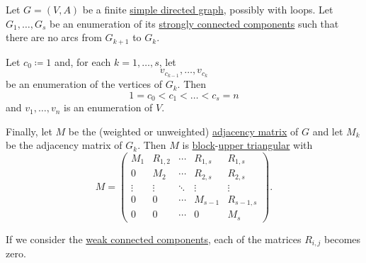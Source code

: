 \begin{proposition}\label{thm:adjacency_matrix_components}
  Let \( G = (V, A) \) be a finite \hyperref[def:directed_graph]{simple directed graph}, possibly with loops. Let \( G_1, \ldots, G_s \) be an enumeration of its \hyperref[def:graph_connectedness/strong]{strongly connected components} such that there are no arcs from \( G_{k+1} \) to \( G_k \).

  Let \( c_0 \coloneqq 1 \) and, for each \( k = 1, \ldots, s \), let
  \begin{equation*}
    v_{c_{k-1}}, \ldots, v_{c_k}
  \end{equation*}
  be an enumeration of the vertices of \( G_k \). Then
  \begin{equation*}
    1 = c_0 < c_1 < \ldots < c_s = n
  \end{equation*}
  and \( v_1, \ldots, v_n \) is an enumeration of \( V \).

  Finally, let \( M \) be the (weighted or unweighted) \hyperref[def:graph_adjacency_matrix]{adjacency matrix} of \( G \) and let \( M_k \) be the adjacency matrix of \( G_k \). Then \( M \) is \hyperref[def:block_matrix]{block}-\hyperref[def:triangular_matrix]{upper triangular} with
  \begin{equation}\label{eq:thm:adjacency_matrix_components}
    M = \begin{pmatrix}
      M_1    & R_{1,2} & \cdots & R_{1,s} & R_{1,s} \\
      0      & M_2     & \cdots & R_{2,s} & R_{2,s} \\
      \vdots & \vdots  & \ddots & \vdots  & \vdots  \\
      0      & 0       & \cdots & M_{s-1} & R_{s-1,s} \\
      0      & 0       & \cdots & 0       & M_s
    \end{pmatrix}.
  \end{equation}

  If we consider the \hyperref[def:graph_connectedness/weak]{weak connected components}, each of the matrices \( R_{i,j} \) becomes zero.
\end{proposition}
